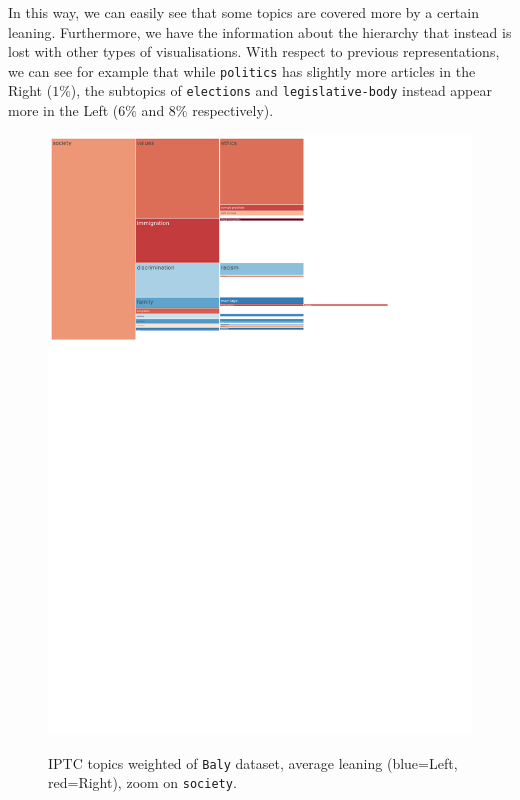 In this way, we can easily see that some topics are covered more by a certain leaning. Furthermore, we have the information about the hierarchy that instead is lost with other types of visualisations.
%
With respect to previous representations, we can see for example that while \texttt{politics} has slightly more articles in the Right ($1\%$), the subtopics of \texttt{elections} and \texttt{legislative-body} instead appear more in the Left ($6\%$ and $8\%$ respectively).


\begin{figure}[!htbp]
    \centering
    \href{https://martinomensio.github.io/phd-project/figures/baly_iptc_weighted_by_leaning.html}{\includegraphics[trim={0.15cm 19.5cm 5cm 0.15cm},clip,width=\linewidth]{figures/baly_iptc_weighted_by_leaning_zoom_society.pdf}}
    \caption{IPTC topics weighted of \texttt{Baly} dataset, average leaning (blue=Left, red=Right), zoom on \texttt{society}.}
    \label{fig:baly_iptc_weighted_by_leaning_zoom_society}
\end{figure}

